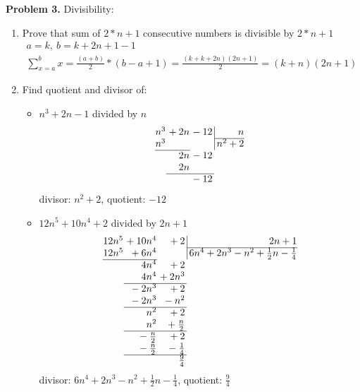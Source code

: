\documentclass[a4paper,12pt]{article}
\newenvironment{problem}[1]{\par\bigskip\noindent\textbf{Problem #1.} \newline}{}
\begin{document}
  \begin{problem}{3}
    Divisibility:

    \begin{enumerate}
    \item Prove that sum of $2*n + 1$ consecutive numbers is divisible by $2 * n
      + 1$\
      \begin{eqnarray*}
        \label{eq:problem3i1}
        a = k,\ b = k + 2n + 1 - 1\\
        \sum_{x=a}^b x = \frac{(a + b)}{2} * (b - a + 1) = \frac{(k + k + 2n)(2n + 1)}{2} = (k + n)(2n + 1)
      \end{eqnarray*}
    \item Find quotient and divisor of:
      \begin{itemize}
      \item $n^3+2n-1$ divided by $n$
        $$
        \arraycolsep=0.05em
        \begin{array}{rrr@{\,}r|r}
          n^3&{}+2n&{}-12&&\,n\\
          \cline{5-5}
          n^3&{}&&&\,n^2 + 2\\
          \cline{1-2}
          &{}2n&{}-12\\
          &{}2n&{}\\
          \cline{2-3}
          &{}&{}-12
        \end{array}
        $$
        divisor: $n^2 + 2$, quotient: $-12$
      \item $12n^5+10n^4+2$ divided by $2n+1$
        $$
        \arraycolsep=0.05em
        \begin{array}{rrr@{\,}r|r}
          12n^5&{} + 10n^4&{}+2&&\,2n+1\\
          \cline{5-5}
          12n^5&{} + 6n^4&&&\,6n^4 + 2n^3 - n^2 + \frac{1}{2}n - \frac14\\
          \cline{1-2}
          &{}4n^4&{}+2\\
          &{}4n^4&{} + 2n^3\\
          \cline{2-3}
          &{}-2n^3&{} + 2\\
          &{}-2n^3&{} - n^2\\
          \cline{2-3}
          &{}n^2&{}+2\\
          &{}n^2&{}+\frac{n}{2}\\
          \cline{2-3}
          &{}-\frac{n}{2}&{} + 2\\
          &{}-\frac{n}{2}&{} - \frac14\\
          \cline{2-3}
          &{}&{}\frac94
        \end{array}
        $$
        divisor: $6n^4 + 2n^3 - n^2 + \frac{1}{2}n - \frac14$, quotient: $\frac94$
      \end{itemize}
    \end{enumerate}
  \end{problem}
\end{document}
